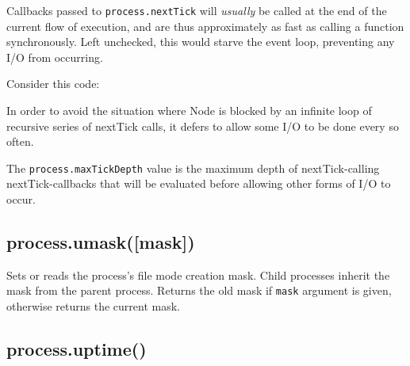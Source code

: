 Callbacks passed to \texttt{process.nextTick} will \emph{usually} be
called at the end of the current flow of execution, and are thus
approximately as fast as calling a function synchronously. Left
unchecked, this would starve the event loop, preventing any I/O from
occurring.

Consider this code:

\begin{Shaded}
\begin{Highlighting}[]
\NormalTok{(} 
\NormalTok{\});}
\end{Highlighting}
\end{Shaded}

In order to avoid the situation where Node is blocked by an infinite
loop of recursive series of nextTick calls, it defers to allow some I/O
to be done every so often.

The \texttt{process.maxTickDepth} value is the maximum depth of
nextTick-calling nextTick-callbacks that will be evaluated before
allowing other forms of I/O to occur.

\subsection{process.umask({[}mask{]})}

Sets or reads the process's file mode creation mask. Child processes
inherit the mask from the parent process. Returns the old mask if
\texttt{mask} argument is given, otherwise returns the current mask.

\begin{Shaded}
\begin{Highlighting}[]
 \NormalTok{;}

\NormalTok{(} \NormalTok{+ }\NormalTok{(}\NormalTok{) +}
             \NormalTok{+ }\NormalTok{(}\NormalTok{));}
\end{Highlighting}
\end{Shaded}

\subsection{process.uptime()}

